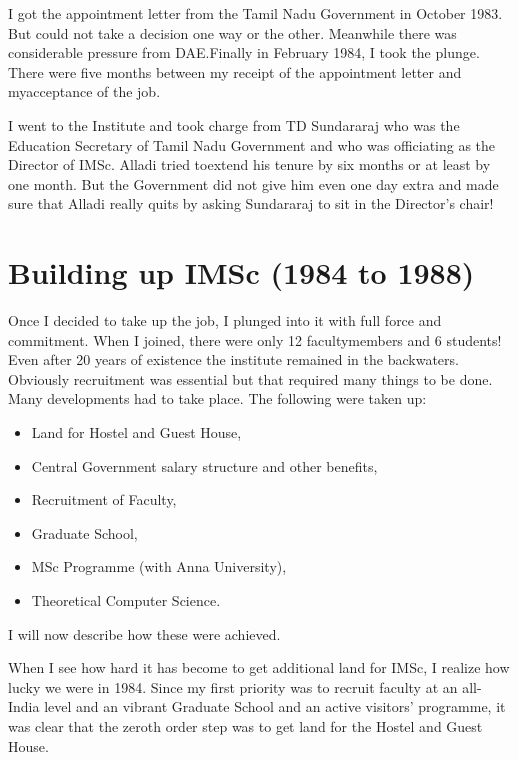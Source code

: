I got the appointment letter from the Tamil Nadu Government in October 
1983. But could not take a decision one way or the other. Meanwhile 
there was considerable pressure from DAE.\break Finally in February 1984, I 
took the plunge. There were five months between my receipt of the 
appointment letter and my\break acceptance of the job.

I went to the Institute and took charge from TD Sundararaj who was the 
Education Secretary of Tamil Nadu Government and who was officiating as 
the Director of IMSc. Alladi tried to\break extend his tenure by six months or 
at least by one month. But the Government did not give him even one day 
extra and made sure that Alladi really quits by asking Sundararaj to sit 
in the Director's chair!


\section*{Building up IMSc (1984 to 1988)}

Once I decided to take up the job, I plunged into it with full force and 
commitment. When I joined, there were only 12 faculty\break members and 6 
students! Even after 20 years of existence the institute remained in the 
backwaters. Obviously recruitment was essential but that required many 
things to be done. Many develop\-ments had to take place. The following 
were taken up:

\begin{itemize}
\itemsep=0pt
\item Land for Hostel and Guest House, 
\item Central Government salary structure and other benefits, 
\item Recruitment of Faculty, 
\item Graduate School, 
\item MSc Programme (with Anna University), 
\item Theoretical Computer Science.
\end{itemize}

I will now describe how these were achieved. 

When I see how hard it has become to get additional land for IMSc, I 
realize how lucky we were in 1984. Since my first priority was to 
recruit faculty at an all-India level and an vibrant Graduate School and 
an active visitors' programme, it was clear that the zeroth order step 
was to get land for the Hostel and Guest House.

